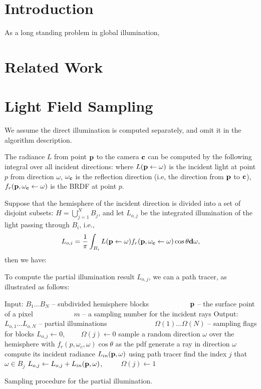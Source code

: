 \documentclass[review]{acmsiggraph}
\begin{document}
\section{Introduction}
As a long standing problem in global illumination,
\section{Related Work}

\section{Light Field Sampling}
We assume the direct illumination is computed separately, and omit it in the algorithm description. 

The radiance $L$ from point ${\bf p}$ to the camera ${\bf c}$ can be computed by the following integral over all incident directions:
where $L({\bf p} \leftarrow \omega)$ is the incident light at point $p$ from direction $\omega$, $\omega_{\bf c}$ is the reflection direction (i.e, the direction from ${\bf p}$ to ${\bf c}$), $f_r({\bf p},\omega_{\bf c}\leftarrow\omega)$ is the BRDF at point $p$.

Suppose that the hemisphere of the incident direction is divided into a set of disjoint subsets: $H = \bigcup_{j=1}^N B_j$, and let $L_{o,j}$ be the integrated illumination of the light passing through $B_i$, i.e.,
$$L_{o,i} = \frac{1}{\pi} \int_{B_i} L({\bf p} \leftarrow \omega) f_r({\bf p}, \omega_{\bf c} \leftarrow \omega) \cos\theta {\bf d}\omega, $$ 
then we have:

To compute the partial illumination result $L_{o,j}$, we can a path tracer, as illustrated as follows: 

\begin{algorithm}[h]
\begin{algorithmic}[1]
	\STATE Input: $B_1\ldots B_N$ -- subdivided hemisphere blocks\;
	\STATE ~~~~~~~~~~~${\bf p}$ -- the surface point of a pixel\;
	\STATE ~~~~~~~~~~~$m$ -- a sampling number for the incident rays\;
	\STATE Output: $L_{o,1}\ldots L_{o,N}$ -- partial illuminations\; 
	\STATE ~~~~~~~~~~~~~$\Omega(1)\ldots \Omega(N)$ -- sampling flags for blocks\;
		\STATE $L_{o,j} \leftarrow 0$, ~~~~$\Omega(j)\leftarrow 0$
	\ENDFOR
		\STATE sample a random direction $\omega$ over the hemisphere with $f_r(p,\omega_c,\omega)\cos\theta$ as the pdf \;
		\STATE generate a ray in direction $\omega$ \;
		\STATE compute its incident radiance $L_{in}({\bf p},\omega)$ using path tracer \;
		\STATE find the index $j$ that $\omega\in B_j$ \;
		\STATE $L_{o,j} \leftarrow L_{o,j} + L_{in}({\bf p}, \omega)$, ~~~~ $\Omega(j) \leftarrow 1$ \;
	\ENDFOR
\end{algorithmic}
\caption{Sampling procedure for the partial illumination.}
\label{alg:sampling}
\end{algorithm}
\end{document}
